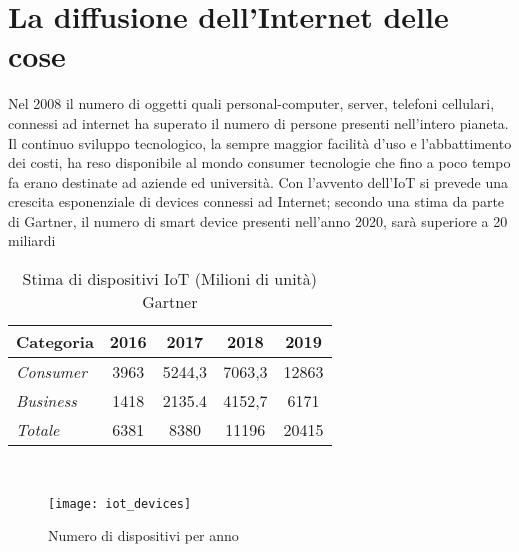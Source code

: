 \section{La diffusione dell'Internet delle cose}
Nel 2008 il numero di oggetti quali personal-computer, server, telefoni cellulari,
connessi ad internet ha superato il numero di persone presenti nell'intero
pianeta. Il continuo sviluppo tecnologico, la sempre maggior facilità d'uso e
l'abbattimento dei costi, ha reso disponibile al mondo consumer tecnologie che
fino a poco tempo fa erano destinate ad aziende ed università. 
Con l'avvento dell'IoT si prevede una crescita esponenziale di devices connessi
ad Internet;  secondo  una stima da parte di Gartner, il numero di smart
device presenti nell'anno 2020, sarà superiore a 20 miliardi \cite{gartner2016}
\\
\begin{table}[h]
        \centering
        \begin{tabular}{l|c|c|c|c}
                \textbf{Categoria}  & 2016 & 2017 & 2018 & 2019 \\
                \hline
                \emph{Consumer}  & 3963 & 5244,3 & 7063,3 & 12863 \\
                \emph{Business}  & 1418 & 2135.4 & 4152,7 & 6171  \\
                \emph{Totale }   & 6381 & 8380   & 11196  & 20415 \\
        \end{tabular}
        \caption{Stima di dispositivi IoT (Milioni di unità)
        Gartner\cite{gartner2016}}
\end{table}
\\
\begin{figure}[h]
        \centering 
                \texttt{[image: iot\_devices]}
        \caption{Numero di dispositivi per anno}
\end{figure}
